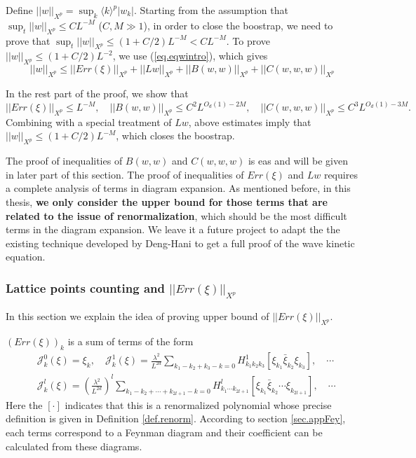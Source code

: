 Define $||w||_{X^p}=\sup_{k} \langle k\rangle^{p} |w_k|$. Starting from the assumption that $\sup_t||w||_{X^p}\le CL^{-M}$ ($C,M\gg 1$), in order to close the boostrap, we need to prove that $\sup_t||w||_{X^p}\le (1+C/2)L^{-M}<CL^{-M}$. To prove $||w||_{X^p}\le (1+C/2)L^{-2}$, we use (\ref{eq.eqwintro}), which gives
\begin{equation}\label{eq.ineqw}
    ||w||_{X^p}\le ||Err(\xi)||_{X^p}+||Lw||_{X^p}+||B(w,w)||_{X^p}+||C(w,w,w)||_{X^p}
\end{equation}

In the rest part of the proof, we show that 
\begin{equation}
    ||Err(\xi)||_{X^p}\le L^{-M},
    \quad ||B(w,w)||_{X^p}\le C^2L^{O_d(1)-2M},
    \quad||C(w,w,w)||_{X^p}\le C^3L^{O_d(1)-3M}.
\end{equation}
Combining with a special treatment of $Lw$, above estimates imply that $||w||_{X^p}\le (1+C/2)L^{-M}$, which closes the boostrap.

The proof of inequalities of $B(w,w)$ and $C(w,w,w)$ is eas and will be given in later part of this section. The proof of inequalities of $Err(\xi)$ and $Lw$ requires a complete analysis of terms in diagram expansion. As mentioned before, in this thesis, \textbf{we only consider the upper bound for those terms that are related to the issue of renormalization}, which should be the most difficult terms in the diagram expansion. We leave it a future project to adapt the the existing technique developed by Deng-Hani to get a full proof of the wave kinetic equation.


\subsubsection{Lattice points counting and $||Err(\xi)||_{X^p}$}\label{sec.latticeintro} In this section we explain the idea of proving upper bound of $||Err(\xi)||_{X^p}$.

$(Err(\xi))_{k}$ is a sum of terms of the form
\begin{equation}\label{eq.Errsumterms}
\begin{split}
    &\mathcal{J}_k^0(\xi)=  \xi_k, \quad \mathcal{J}_k^1(\xi)=\frac{\lambda^2}{L^{2d}} \sum_{k_1-k_2+k_3-k=0} H^1_{k_1k_2k_3}  [\xi_{k_1}\bar{\xi}_{k_2}\xi_{k_3}] , \quad\cdots  \\
    &\mathcal{J}_k^l(\xi)=\left(\frac{\lambda^2}{L^{2d}}\right)^l\sum_{k_1-k_2+\cdots+k_{2l+1}-k=0} H^l_{k_1\cdots k_{2l+1}}  [\xi_{k_1}\bar{\xi}_{k_2}\cdots\xi_{k_{2l+1}}], \quad\cdots 
\end{split}
\end{equation}
Here the $[\cdot]$ indicates that this is a renormalized polynomial whose precise definition is given in Definition \ref{def.renorm}. According to section \ref{sec.appFey}, each terms correspond to a Feynman diagram and their coefficient can be calculated from these diagrams. 


